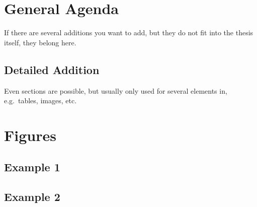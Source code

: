\chapter{General Agenda}

If there are several additions you want to add, but they do not fit into the thesis itself, they belong here.

\section{Detailed Addition}

Even sections are possible, but usually only used for several elements in, e.g.\ tables, images, etc.

\chapter{Figures}
\section{Example 1}
\cmark
\section{Example 2}
\xmark